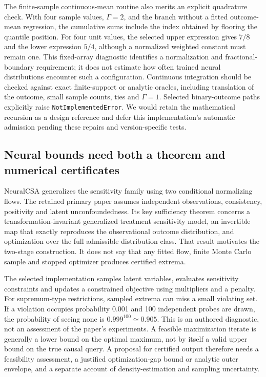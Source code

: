 The finite-sample continuous-mean routine also merits an explicit quadrature check. With four sample values, $\Gamma=2$, and the branch without a fitted outcome-mean regression, the cumulative sums include the index obtained by flooring the quantile position. For four unit values, the selected upper expression gives $7/8$ and the lower expression $5/4$, although a normalized weighted constant must remain one. This fixed-array diagnostic identifies a normalization and fractional-boundary requirement; it does not estimate how often trained neural distributions encounter such a configuration. Continuous integration should be checked against exact finite-support or analytic oracles, including translation of the outcome, small sample counts, ties and $\Gamma=1$. Selected binary-outcome paths explicitly raise \texttt{NotImplementedError}. We would retain the mathematical recursion as a design reference and defer this implementation's automatic admission pending these repairs and version-specific tests. \citep{exec25_pymed_sharp,exec25_pymed_choice}

\subsection{Neural bounds need both a theorem and numerical certificates}
NeuralCSA generalizes the sensitivity family using two conditional normalizing flows. The retained primary paper assumes independent observations, consistency, positivity and latent unconfoundedness. Its key sufficiency theorem concerns a transformation-invariant generalized treatment sensitivity model, an invertible map that exactly reproduces the observational outcome distribution, and optimization over the full admissible distribution class. That result motivates the two-stage construction. It does not say that any fitted flow, finite Monte Carlo sample and stopped optimizer produces certified extrema. \citep{exec25_pymed_neural_paper}

The selected implementation samples latent variables, evaluates sensitivity constraints and updates a constrained objective using multipliers and a penalty. For supremum-type restrictions, sampled extrema can miss a small violating set. If a violation occupies probability 0.001 and 100 independent probes are drawn, the probability of seeing none is $0.999^{100}\simeq0.905$. This is an authored diagnostic, not an assessment of the paper's experiments. A feasible maximization iterate is generally a lower bound on the optimal maximum, not by itself a valid upper bound on the true causal query. A proposal for certified output therefore needs a feasibility assessment, a justified optimization-gap bound or analytic outer envelope, and a separate account of density-estimation and sampling uncertainty. \citep{exec25_pymed_neuralcsa,exec25_pymed_neural_paper,exec25_pymed_choice}

